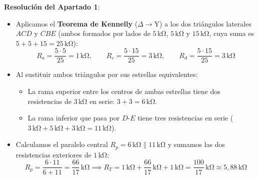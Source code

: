 \begin{ejercicio}
\begin{center}
\end{center}
\textbf{Resolución del Apartado 1}:
\begin{itemize}
    \item Aplicamos el \textbf{Teorema de Kennelly} ($\Delta \to \text{Y}$) a los dos triángulos laterales $ACD$ y $CBE$ (ambos formados por lados de $5\,\si{\kilo\ohm}$, $5\,\si{\kilo\ohm}$ y $15\,\si{\kilo\ohm}$, cuya suma es $5 + 5 + 15 = 25\,\si{\kilo\ohm}$):
    \begin{equation*}
        R_a = \frac{5\cdot 5}{25} = 1\,\si{\kilo\ohm}, \qquad R_c = \frac{5\cdot 15}{25} = 3\,\si{\kilo\ohm}, \qquad R_d = \frac{5\cdot 15}{25} = 3\,\si{\kilo\ohm}
    \end{equation*}
    \item Al sustituir ambos triángulos por sus estrellas equivalentes:
    \begin{itemize}
        \item La rama superior entre los centros de ambas estrellas tiene dos resistencias de $3\,\si{\kilo\ohm}$ en serie: $3 + 3 = 6\,\si{\kilo\ohm}$.
        \item La rama inferior que pasa por $D$-$E$ tiene tres resistencias en serie ($3\,\si{\kilo\ohm} + 5\,\si{\kilo\ohm} + 3\,\si{\kilo\ohm} = 11\,\si{\kilo\ohm}$).
    \end{itemize}
    \item Calculamos el paralelo central $R_p = 6\,\si{\kilo\ohm} \parallel 11\,\si{\kilo\ohm}$ y sumamos las dos resistencias exteriores de $1\,\si{\kilo\ohm}$:
    \begin{equation*}
        R_p = \frac{6\cdot 11}{6 + 11} = \frac{66}{17}\,\si{\kilo\ohm} \implies \boxed{R_T = 1\,\si{\kilo\ohm} + \frac{66}{17}\,\si{\kilo\ohm} + 1\,\si{\kilo\ohm} = \frac{100}{17}\,\si{\kilo\ohm} \approx 5{,}88\,\si{\kilo\ohm}}
    \end{equation*}
\end{itemize}


\end{ejercicio}
